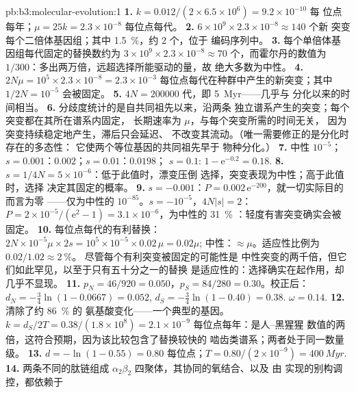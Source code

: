 \begin{solution}{pb:b3:molecular-evolution:1}
\textbf{1.} $k = 0.012/(2\times 6.5\times 10^{6}) = 9.2\times 10^{-10}$ 每
位点每年；$\mu = 25k = 2.3\times 10^{-8}$ 每位点每代。
\textbf{2.} $6\times 10^{9}\times 2.3\times 10^{-8} \approx 140$ 个新
突变每个二倍体基因组；其中 \qty{1.5}{\%}，约 $2$ 个，位于
编码序列中。
\textbf{3.} 每个单倍体基因组每代固定的替换数约为 $3\times 10^{9}\times 2.3\times 10^{-8}
\approx 70$ 个，而霍尔丹的数值为
$1/300$：多出两万倍，远超选择所能驱动的量，故
绝大多数为中性。
\textbf{4.} $2N\mu = 10^{5}\times 2.3\times 10^{-8} = 2.3\times 10^{-3}$
每位点每代在种群中产生的新突变；其中 $1/2N =
10^{-5}$ 会被固定。
\textbf{5.} $4N = \num{200000}$ 代，即 \qty{5}{Myr}——几乎与
分化以来的时间相当。
\textbf{6.} 分歧度统计的是自共同祖先以来，沿两条
独立谱系产生的突变；每个突变都在其所在谱系内固定，
长期速率为 $\mu$，与每个突变所需的时间无关，
因为突变持续稳定地产生，滞后只会延迟、
不改变其流动。（唯一需要修正的是分化时存在的多态性：
它使两个等位基因的共同祖先早于
物种分化。）
\textbf{7.} 中性 $10^{-5}$；$s = 0.001$：$0.002$；$s = 0.01$：$0.0198$；
$s = 0.1$: $1 - \mathrm{e}^{-0.2} = 0.18$.
\textbf{8.} $s = 1/4N = 5\times 10^{-6}$：低于此值时，漂变压倒
选择，突变表现为中性；高于此值时，选择
决定其固定的概率。
\textbf{9.} $s = -0.001$：$P = 0.002\,\mathrm{e}^{-200}$，就一切实际目的而言为零
——仅为中性的 $10^{-85}$。$s = -10^{-5}$，$4N|s| = 2$：$P =
2\times 10^{-5}/(\mathrm{e}^{2} - 1) = 3.1\times 10^{-6}$，为中性的 \qty{31}{\%}
：轻度有害突变确实会被固定。
\textbf{10.} 每位点每代的有利替换：$2N\times
10^{-5}\mu\times 2s = 10^{5}\times 10^{-5}\times 0.02\,\mu = 0.02\mu$;
中性：$\approx\mu$。适应性比例为 $0.02/1.02 \approx \qty{2}{\%}$。
尽管每个有利突变被固定的可能性是
中性突变的两千倍，但它们如此罕见，以至于只有五十分之一的替换
是适应性的：选择确实在起作用，却几乎不显现。
\textbf{11.} $p_{N} = 46/920 = 0.050$，$p_{S} = 84/280 = 0.30$。校正后：
$d_{N} = -\tfrac{3}{4}\ln(1 - 0.0667) = 0.052$, $d_{S} = -\tfrac{3}{4}
\ln(1 - 0.40) = 0.38$. $\omega = 0.14$.
\textbf{12.} 清除了约 \qty{86}{\%} 的
氨基酸变化——一个典型的基因。$k = d_{S}/2T = 0.38/(1.8\times
10^{8}) = 2.1\times 10^{-9}$ 每位点每年：是人–黑猩猩
数值的两倍，这符合预期，因为该比较包含了替换较快的
啮齿类谱系；两者处于同一数量级。
\textbf{13.} $d = -\ln(1 - 0.55) = 0.80$ 每位点；$T = 0.80/(2\times
10^{-9}) = \qty{400}{Myr}$.
\textbf{14.} 两条不同的肽链组成 $\alpha_{2}\beta_{2}$
四聚体，其协同的氧结合、以及
由 实现的别构调控，都依赖于

\end{solution}
